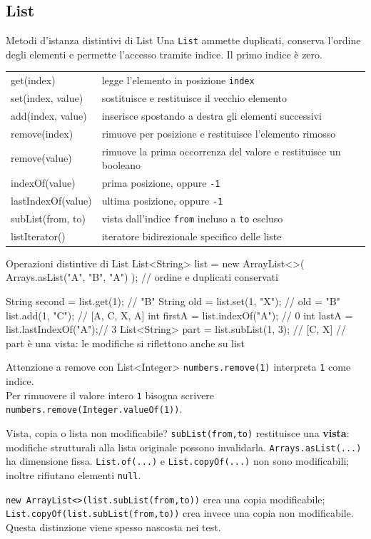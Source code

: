 ﻿\documentclass[10pt,a4paper]{article}
\newcommand{\cmd}[1]{\texttt{#1}}
\newcommand{\topicsubsection}[1]{\Needspace{10\baselineskip}\subsection{#1}}
\begin{document}
\topicsubsection{List}
\begin{concept}{Metodi d'istanza distintivi di List}
Una \cmd{List} ammette duplicati, conserva l'ordine degli elementi e permette
l'accesso tramite indice. Il primo indice è zero.

\begin{tabularx}{\textwidth}{>{\ttfamily\small}p{4cm} X}
get(index) & legge l'elemento in posizione \cmd{index} \\
set(index, value) & sostituisce e restituisce il vecchio elemento \\
add(index, value) & inserisce spostando a destra gli elementi successivi \\
remove(index) & rimuove per posizione e restituisce l'elemento rimosso \\
remove(value) & rimuove la prima occorrenza del valore e restituisce un booleano \\
indexOf(value) & prima posizione, oppure \cmd{-1} \\
lastIndexOf(value) & ultima posizione, oppure \cmd{-1} \\
subList(from, to) & vista dall'indice \cmd{from} incluso a \cmd{to} escluso \\
listIterator() & iteratore bidirezionale specifico delle liste \\
\end{tabularx}
\end{concept}

\begin{codebox}{Operazioni distintive di List}
List<String> list = new ArrayList<>(
    Arrays.asList("A", "B", "A")
); // ordine e duplicati conservati

String second = list.get(1);      // "B"
String old = list.set(1, "X");    // old = "B"
list.add(1, "C");                 // [A, C, X, A]
int firstA = list.indexOf("A");   // 0
int lastA = list.lastIndexOf("A");// 3
List<String> part = list.subList(1, 3); // [C, X]
// part è una vista: le modifiche si riflettono anche su list
\end{codebox}

\begin{difference}{Attenzione a remove con List<Integer>}
\cmd{numbers.remove(1)} interpreta \cmd{1} come indice.\\
Per rimuovere il valore intero \cmd{1} bisogna scrivere
\cmd{numbers.remove(Integer.valueOf(1))}.
\end{difference}

\begin{examtrap}{Vista, copia o lista non modificabile?}
\cmd{subList(from,to)} restituisce una \textbf{vista}: modifiche strutturali
alla lista originale possono invalidarla. \cmd{Arrays.asList(...)} ha
dimensione fissa. \cmd{List.of(...)} e \cmd{List.copyOf(...)} non sono
modificabili; inoltre rifiutano elementi \cmd{null}.

\cmd{new ArrayList<>(list.subList(from,to))} crea una copia modificabile;
\cmd{List.copyOf(list.subList(from,to))} crea invece una copia non
modificabile. Questa distinzione viene spesso nascosta nei test.
\end{examtrap}
\end{document}
